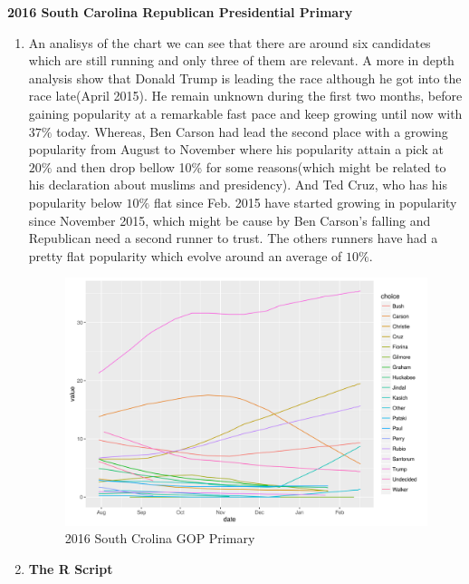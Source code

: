 \documentclass{article}[14pt]
\begin{document}
\begin{section}
{\bf \large 2016 South Carolina Republican Presidential Primary}
\bigskip
\bigskip
\begin{enumerate}[]
\item %
An analisys of the chart we can see that there are around six candidates which are still running and only three of them are  relevant. A more in depth analysis show that Donald Trump is leading the race although he got into the race late(April 2015).  He remain unknown during the first two months, before gaining  popularity at a remarkable fast pace and keep growing until now with   $37\%$ today. Whereas, Ben Carson  had lead the second place with a growing popularity from August  to November where his popularity attain a pick at $ 20 \%$ and then drop bellow 10\% for some reasons(which might be related to his declaration about muslims and presidency). And Ted Cruz, who has his popularity below $10\%$ flat since Feb. 2015 have started growing in popularity since November 2015, which might be cause by Ben Carson's falling and Republican need a second runner to trust. The others runners have had a pretty flat popularity which evolve around an average of $10\%$.
\begin{figure}[h]
\begin{center}
\includegraphics[width=\linewidth]{sc_gop}
\end{center}
\caption{2016 South Crolina GOP Primary}
\label{fig:figure 3}
\end{figure}

\item {\bf The R Script} %



\end{enumerate}
\end{section}
\end{document}
